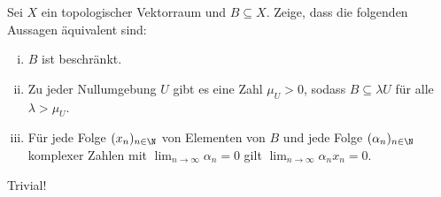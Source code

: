\begin{exercise}

Sei $X$ ein topologischer Vektorraum und $B \subseteq X$.
Zeige, dass die folgenden Aussagen äquivalent sind:

\begin{enumerate}[(i)]
  \item $B$ ist beschränkt.
  \item Zu jeder Nullumgebung $U$ gibt es eine Zahl $\mu_U > 0$, sodass $B \subseteq \lambda U$ für alle $\lambda > \mu_U$.
  \item Für jede Folge $(x_n)_{n \in \N}$ von Elementen von $B$ und jede Folge $(\alpha_n)_{n \in \N}$ komplexer Zahlen mit $\lim_{n \to \infty} \alpha_n = 0$ gilt $\lim_{n \to \infty} \alpha_n x_n = 0$.
\end{enumerate}

\end{exercise}

\begin{solution}

Trivial!

\end{solution}
